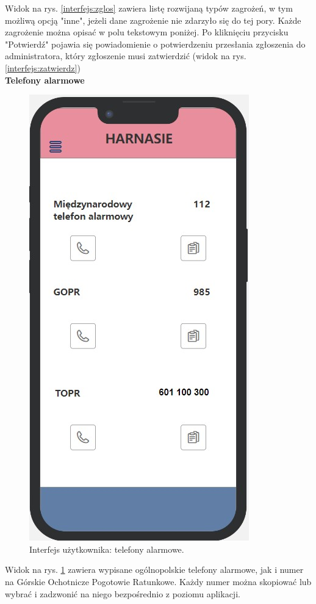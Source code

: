    Widok na rys. \ref{interfejs:zglos} zawiera listę rozwijaną typów zagrożeń, w tym możliwą opcją "inne", jeżeli dane zagrożenie nie zdarzyło się do tej pory. Każde zagrożenie można opisać w polu tekstowym poniżej. Po kliknięciu przycisku "Potwierdź" pojawia się powiadomienie o potwierdzeniu przesłania zgłoszenia do administratora, który zgłoszenie musi zatwierdzić (widok na rys. \ref{interfejs:zatwierdz}) \\
   \textbf{Telefony alarmowe}
    \begin{figure}[H]
        \centering
        \includegraphics[scale=0.5]{img/interfejsy/if_alarmm.jpg}
        \caption{Interfejs użytkownika: telefony alarmowe.}
        \label{interfejs:alarm}
    \end{figure}
   Widok na rys. \ref{interfejs:alarm} zawiera wypisane ogólnopolskie telefony alarmowe, jak i numer na Górskie Ochotnicze Pogotowie Ratunkowe. Każdy numer można skopiować lub wybrać i zadzwonić na niego bezpośrednio z poziomu aplikacji.

